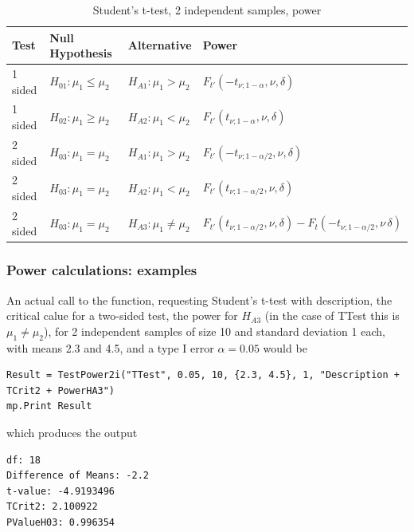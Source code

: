\begin{table}[ht]
	\centering
	\begin{tabular}{|l|l|l|l|}
		\hline
		Test &Null Hypothesis &Alternative & Power \\
		\hline
		1 sided & $H_{01}: \mu_1 \leq \mu_2$ & $H_{A1}: \mu_1 > \mu_2$ & $F_{t'}\left(-t_{\nu;1-\alpha}, \nu, \delta \right)$ \\
		1 sided & $H_{02}: \mu_1 \geq \mu_2$ & $H_{A2}: \mu_1 < \mu_2$ & $F_{t'}\left(t_{\nu;1-\alpha}, \nu, \delta \right)$  \\
		\hline
		2 sided & $H_{03}: \mu_1 = \mu_2$ & $H_{A1}: \mu_1 > \mu_2$ & $F_{t'}\left(-t_{\nu;1-\alpha/2}, \nu, \delta \right)$ \\
		2 sided & $H_{03}: \mu_1 = \mu_2$ & $H_{A2}: \mu_1 < \mu_2$ & $F_{t'}\left(t_{\nu;1-\alpha/2}, \nu, \delta \right)$  \\
		2 sided & $H_{03}: \mu_1 = \mu_2$ & $H_{A3}: \mu_1 \neq \mu_2$ & $F_{t'}\left(t_{\nu;1-\alpha/2}, \nu, \delta \right)-F_t\left(-t_{\nu;1-\alpha/2}, \nu\, \delta \right)$ \\
		\hline
	\end{tabular}
	\caption{Student's t-test, 2 independent samples, power}
	\label{TableStudentsttest,2i samples,power}
\end{table}






\subsubsection{Power calculations: examples}
An actual call to the function, requesting Student's t-test with description, the critical calue for a two-sided test, the power for $H_{A3}$ (in the case of \textsf{TTest} this is $\mu_1 \neq \mu_2$), for 2 independent samples of size 10 and standard deviation 1 each, with means 2.3 and 4.5, and a type I error $\alpha=0.05$ would be

\begin{lstlisting}
Result = TestPower2i("TTest", 0.05, 10, {2.3, 4.5}, 1, "Description + TCrit2 + PowerHA3")
mp.Print Result
\end{lstlisting}
which produces the output

\begin{verbatim}
df: 18
Difference of Means: -2.2
t-value: -4.9193496
TCrit2: 2.100922
PValueH03: 0.996354
\end{verbatim}





